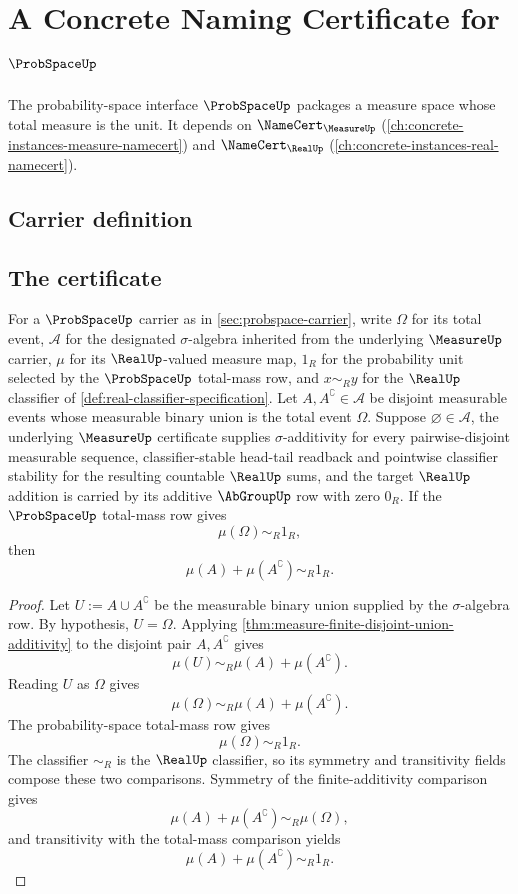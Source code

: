 \chapter{A Concrete Naming Certificate for $\ProbSpaceUp$}
\label{ch:concrete-instances-probspace-namecert}

The probability-space interface $\ProbSpaceUp$ packages a measure space whose total measure is the unit. It depends on $\NameCert_{\MeasureUp}$ (\autoref{ch:concrete-instances-measure-namecert}) and $\NameCert_{\RealUp}$ (\autoref{ch:concrete-instances-real-namecert}).

\section{Carrier definition}
\label{sec:probspace-carrier}

\section{The certificate}
\label{sec:probspace-certificate}

\begin{theorem}
\label{thm:probspace-complement-mass-additivity}
For a $\ProbSpaceUp$ carrier as in \autoref{sec:probspace-carrier}, write $\Omega$ for its total event, $\mathcal{A}$ for the designated $\sigma$-algebra inherited from the underlying $\MeasureUp$ carrier, $\mu$ for its $\RealUp$-valued measure map, $1_R$ for the probability unit selected by the $\ProbSpaceUp$ total-mass row, and $x\sim_R y$ for the $\RealUp$ classifier of \autoref{def:real-classifier-specification}. Let $A,A^\complement\in\mathcal{A}$ be disjoint measurable events whose measurable binary union is the total event $\Omega$. Suppose $\varnothing\in\mathcal{A}$, the underlying $\MeasureUp$ certificate supplies $\sigma$-additivity for every pairwise-disjoint measurable sequence, classifier-stable head-tail readback and pointwise classifier stability for the resulting countable $\RealUp$ sums, and the target $\RealUp$ addition is carried by its additive $\AbGroupUp$ row with zero $0_R$. If the $\ProbSpaceUp$ total-mass row gives
$$
\mu(\Omega)\sim_R1_R,
$$
then
$$
\mu(A)+\mu(A^\complement)\sim_R1_R.
$$
\end{theorem}
\begin{proof}
Let $U:=A\cup A^\complement$ be the measurable binary union supplied by the $\sigma$-algebra row. By hypothesis, $U=\Omega$. Applying \autoref{thm:measure-finite-disjoint-union-additivity} to the disjoint pair $A,A^\complement$ gives
$$
\mu(U)\sim_R\mu(A)+\mu(A^\complement).
$$
Reading $U$ as $\Omega$ gives
$$
\mu(\Omega)\sim_R\mu(A)+\mu(A^\complement).
$$
The probability-space total-mass row gives
$$
\mu(\Omega)\sim_R1_R.
$$
The classifier $\sim_R$ is the $\RealUp$ classifier, so its symmetry and transitivity fields compose these two comparisons. Symmetry of the finite-additivity comparison gives
$$
\mu(A)+\mu(A^\complement)\sim_R\mu(\Omega),
$$
and transitivity with the total-mass comparison yields
$$
\mu(A)+\mu(A^\complement)\sim_R1_R.
$$
\end{proof}

